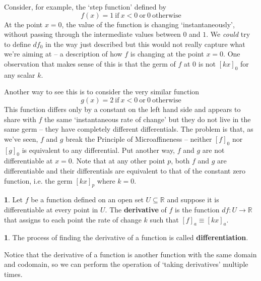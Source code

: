 \documentclass[oneside,english]{amsbook}
\numberwithin{section}{chapter}
\theoremstyle{plain}
\theoremstyle{definition}
\newtheorem{defn}[thm]{\protect\definitionname}
\providecommand{\definitionname}{Definition}
\begin{document}
			Consider, for example, the `step function' defined by
			\[
				f(x) = 1\ \text{if}\ x < 0\ \text{or}\ 0\ \text{otherwise}
			\]
			At the point $x = 0$, the value of the function is changing `instantaneously', without passing through the intermediate values between $0$ and $1$. We \emph{could} try to define $df_0$ in the way just described but this would not really capture what we're aiming at -- a description of how $f$ is changing at the point $x = 0$. One observation that makes sense of this is that the germ of $f$ at $0$ is not $[kx]_0$ for any scalar $k$.
			
			Another way to see this is to consider the very similar function
			\[
				g(x) = 2\ \text{if}\ x < 0\ \text{or}\ 0\ \text{otherwise}
			\]
			This function differs only by a constant on the left hand side and appears to share with $f$ the same `instantaneous rate of change' but they do not live in the same germ -- they have completely different differentials. The problem is that, as we've seen, $f$ and $g$ break the Principle of Microaffineness -- neither $[f]_0$ nor $[g]_0$ is equivalent to any differential. Put another way, $f$ and $g$ are not differentiable at $x = 0$. Note that at any other point $p$, both $f$ and $g$ are differentiable and their differentials are equivalent to that of the constant zero function, i.e. the germ $[kx]_p$ where $k = 0$.
			
			\begin{defn}
				Let $f$ be a function defined on an open set $U\subseteq \mathbb{R}$ and suppose it is differentiable at every point in $U$. The \textbf{derivative} of $f$ is the function $df:U\to\mathbb{R}$ that assigns to each point the rate of change $k$ such that $[f]_a\equiv [kx]_a$.
			\end{defn}
			
			\begin{defn}
				The process of finding the derivative of a function is called \textbf{differentiation}.
			\end{defn}

			Notice that the derivative of a function is another function with the same domain and codomain, so we can perform the operation of `taking derivatives' multiple times. 
			
\end{document}

